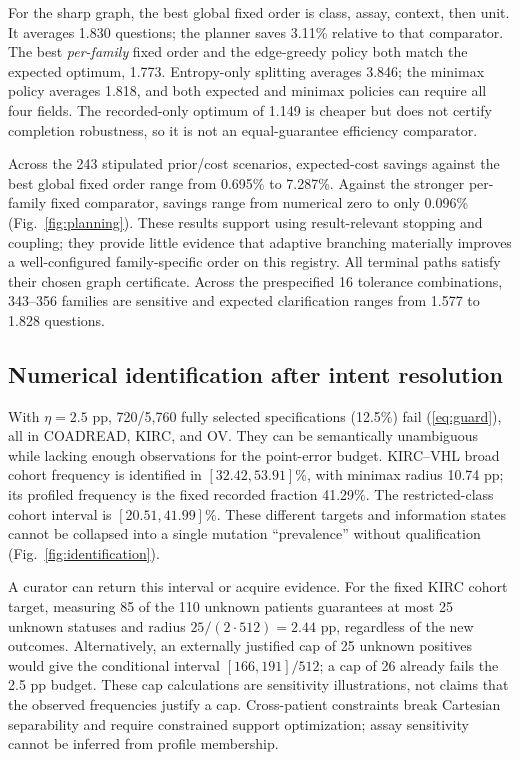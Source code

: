 For the sharp graph, the best global fixed order is class, assay, context, then unit. It averages 1.830 questions; the planner saves 3.11\% relative to that comparator. The best \emph{per-family} fixed order and the edge-greedy policy both match the expected optimum, 1.773. Entropy-only splitting averages 3.846; the minimax policy averages 1.818, and both expected and minimax policies can require all four fields. The recorded-only optimum of 1.149 is cheaper but does not certify completion robustness, so it is not an equal-guarantee efficiency comparator.

Across the 243 stipulated prior/cost scenarios, expected-cost savings against the best global fixed order range from 0.695\% to 7.287\%. Against the stronger per-family fixed comparator, savings range from numerical zero to only 0.096\% (Fig.~\ref{fig:planning}). These results support using result-relevant stopping and coupling; they provide little evidence that adaptive branching materially improves a well-configured family-specific order on this registry. All terminal paths satisfy their chosen graph certificate. Across the prespecified 16 tolerance combinations, 343--356 families are sensitive and expected clarification ranges from 1.577 to 1.828 questions.


\subsection{Numerical identification after intent resolution}
With $\eta=2.5$ pp, 720/5,760 fully selected specifications (12.5\%) fail (\ref{eq:guard}), all in COADREAD, KIRC, and OV. They can be semantically unambiguous while lacking enough observations for the point-error budget. KIRC--VHL broad cohort frequency is identified in $[32.42,53.91]\%$, with minimax radius 10.74 pp; its profiled frequency is the fixed recorded fraction 41.29\%. The restricted-class cohort interval is $[20.51,41.99]\%$. These different targets and information states cannot be collapsed into a single mutation ``prevalence'' without qualification (Fig.~\ref{fig:identification}).

A curator can return this interval or acquire evidence. For the fixed KIRC cohort target, measuring 85 of the 110 unknown patients guarantees at most 25 unknown statuses and radius $25/(2\cdot512)=2.44$ pp, regardless of the new outcomes. Alternatively, an externally justified cap of 25 unknown positives would give the conditional interval $[166,191]/512$; a cap of 26 already fails the 2.5 pp budget. These cap calculations are sensitivity illustrations, not claims that the observed frequencies justify a cap. Cross-patient constraints break Cartesian separability and require constrained support optimization; assay sensitivity cannot be inferred from profile membership.


